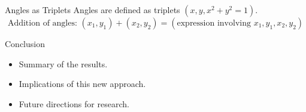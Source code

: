 \documentclass{beamer}
\begin{document}
\begin{frame}{Angles as Triplets}
    Angles are defined as triplets $(x, y, x^2 + y^2 = 1)$.
    \begin{equation}
        \text{Addition of angles: } (x_1, y_1) + (x_2, y_2) = (\text{expression involving } x_1, y_1, x_2, y_2)
    \end{equation}
\end{frame}

\begin{frame}{Conclusion}
    \begin{itemize}
        \item Summary of the results.
        \item Implications of this new approach.
        \item Future directions for research.
    \end{itemize}
\end{frame}
\end{document}
